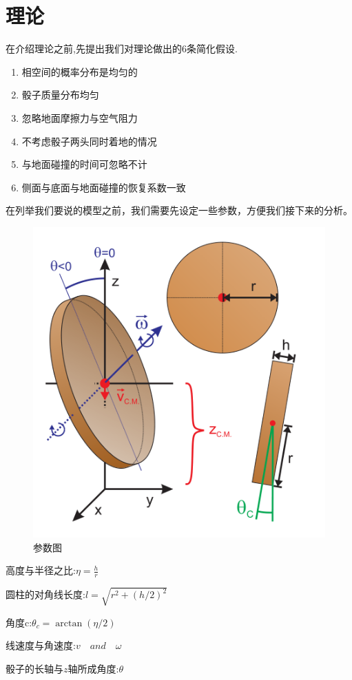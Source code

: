 \documentclass[UTF8]{gapd}
\begin{document}
\section{理论}
\label{sec:Theory}
在介绍理论之前,先提出我们对理论做出的6条简化假设.
\begin{enumerate}
	\item 相空间的概率分布是均匀的
	\item 骰子质量分布均匀
	\item 忽略地面摩擦力与空气阻力
	\item 不考虑骰子两头同时着地的情况
	\item 与地面碰撞的时间可忽略不计
	\item 侧面与底面与地面碰撞的恢复系数一致
\end{enumerate}
在列举我们要说的模型之前，我们需要先设定一些参数，方便我们接下来的分析。
\begin{figure}[h]%
	\centering
	\includegraphics[width=0.8\columnwidth]{images/骰子2}
	\caption{参数图\cite{c3}}
	\label{fig:P2}%
\end{figure}


高度与半径之比:\quad$\eta =\frac{h}{r}$

圆柱的对角线长度:\quad$l=\sqrt{r^2+(h/2)^2}$

角度c:\quad$\theta_{c}  = \arctan (\eta /2)$

线速度与角速度:\quad $v\quad and \quad\omega $

骰子的长轴与$z$轴所成角度:\quad$\theta$
\end{document}
